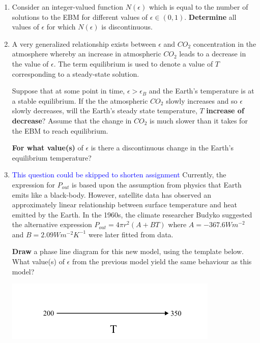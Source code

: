 \documentclass{exam}
\begin{document}
\begin{enumerate}
    \item Consider an integer-valued function $N(\epsilon)$ which is equal to the number of solutions to the EBM for different values of $\epsilon \in (0,1)$. \textbf{Determine} all values of $\epsilon$ for which $N(\epsilon)$ is discontinuous.



    \item A very generalized relationship exists between $\epsilon$ and $CO_2$ concentration in the atmosphere whereby an increase in atmospheric $CO_2$ leads to a decrease in the value of $\epsilon$. The term equilibrium is used to denote a value of $T$ corresponding to a steady-state solution. 
    
    
    Suppose that at some point in time, $\epsilon > \epsilon_B$ and the Earth's temperature is at a stable equilibrium.  If the the atmospheric $CO_2$ slowly increases and so $\epsilon$ slowly decreases, will the Earth's steady state temperature, $T$ \textbf{increase of decrease}? Assume that the change in $CO_2$ is much slower than it takes for the EBM to reach equilibrium.
    
    \textbf{For what value(s)} of $\epsilon$ is there a discontinuous change in the Earth's equilibrium temperature?



    \item \textcolor{blue}{This question could be skipped to shorten assignment}  Currently, the expression for $P_{out}$ is based upon the assumption from physics that Earth emits like a black-body. However, satellite data has observed an approximately linear relationship between surface temperature and heat emitted by the Earth. In the 1960s, the climate researcher Budyko suggested the alternative expression $P_{out}=4 \pi r^2 \left(A + B T \right)$ where $A=-367.6 Wm^{-2}$ and $B=2.09Wm^{-2}K^{-1}$ were later fitted from data.
    
    \textbf{Draw} a phase line diagram for this new model, using the template below. What value(s) of $\epsilon$ from the previous model yield the same behaviour as this model?

    \begin{center}
    \includegraphics[scale=0.7]{math100phaseline1empty.png}
    \end{center}


    
\end{enumerate}
\end{document}
